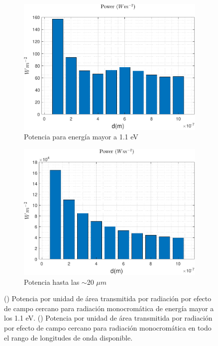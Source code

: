 \begin{figure}[H]
	\centering
		\begin{subfigure}[b]{0.49\textwidth}
	\centering
		\includegraphics[width=1.00\textwidth]{figuras/Resultados/radiacion/p_11_SiSi.pdf}
	\caption{Potencia para energía mayor a 1.1 eV}
	\label{fig:prad_Eg11_SiSi}
\end{subfigure}
\hfill
\begin{subfigure}[b]{0.49\textwidth}
	\centering
		\includegraphics[width=1.00\textwidth]{figuras/Resultados/radiacion/p_full_SiSi.pdf}
	\caption{Potencia hasta las $\sim$20 $\mu m$}
	\label{fig:prad_full_SiSi}
\end{subfigure}
	\caption{() Potencia por unidad de área transmitida por radiación por efecto de campo cercano para radiación monocromática de energía mayor a los 1.1 eV. () Potencia por unidad de área transmitida por radiación por efecto de campo cercano para radiación monocromática en todo el rango de longitudes de onda disponible.}
	\label{fig:prad_SiSi}
\end{figure}
